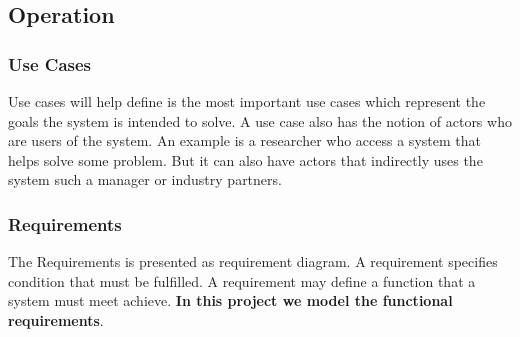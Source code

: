 \subsection{Operation}\label{sc:operation}

\blindtext %

\subsubsection{Use Cases}\label{ssc:usecases}
Use cases will help define is the most important use cases which represent the goals the system is intended to solve. A use case also has the notion of actors who are users of the system. An example is a researcher who access a system that helps solve some problem. But it can also have actors that indirectly uses the system such a manager or industry partners.

\subsubsection{Requirements}\label{ssc:requirements}
The Requirements is presented as requirement diagram. A requirement specifies condition that must be fulfilled. A requirement may define a function that a system must meet achieve. \textbf{In this project we model the functional requirements}. 